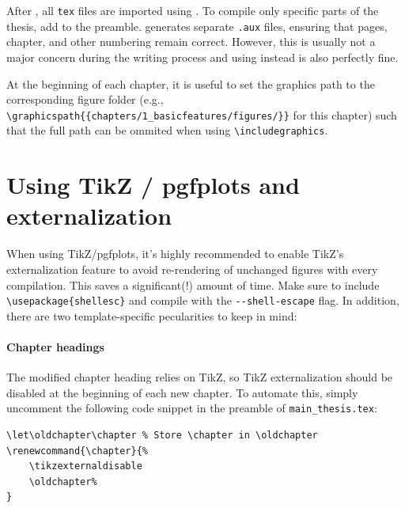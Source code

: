 After \verb||, all \verb|tex| files are imported using \verb||. To compile only specific parts of the thesis, add \verb|| to the preamble. \verb|| generates separate \verb|.aux| files, ensuring that pages, chapter, and other numbering remain correct. However, this is usually not a major concern during the writing process and using \verb|| instead is also perfectly fine.

At the beginning of each chapter, it is useful to set the graphics path to the corresponding figure folder (e.g., \verb|\graphicspath{{chapters/1_basicfeatures/figures/}}| for this chapter) such that the full path can be ommited when using \verb|\includegraphics|.

\section{Using TikZ / pgfplots and externalization}
When using TikZ/pgfplots, it's highly recommended to enable TikZ's externalization feature to avoid re-rendering of unchanged figures with every compilation. This saves a significant(!) amount of time.  
Make sure to include \verb|\usepackage{shellesc}| and compile with the \verb|--shell-escape| flag. In addition, there are two template-specific pecularities to keep in mind: 

\paragraph{Chapter headings} The modified chapter heading relies on TikZ, so TikZ externalization should be disabled at the beginning of each new chapter. To automate this, simply uncomment the following code snippet in the preamble of \verb|main_thesis.tex|:
\begin{lstlisting}
\let\oldchapter\chapter	% Store \chapter in \oldchapter
\renewcommand{\chapter}{%
	\tikzexternaldisable
	\oldchapter%
}
\end{lstlisting}
